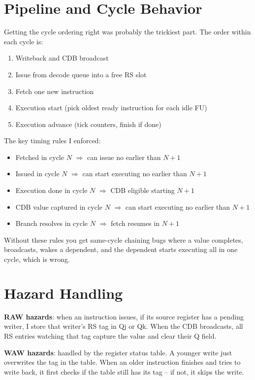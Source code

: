 \documentclass[11pt]{article}
\begin{document}
\section{Pipeline and Cycle Behavior}
Getting the cycle ordering right was probably the trickiest part. The order within each cycle is:

\begin{enumerate}[leftmargin=1.5em]
\item Writeback and CDB broadcast
\item Issue from decode queue into a free RS slot
\item Fetch one new instruction
\item Execution start (pick oldest ready instruction for each idle FU)
\item Execution advance (tick counters, finish if done)
\end{enumerate}

The key timing rules I enforced:

\begin{itemize}
\item Fetched in cycle $N$ $\Rightarrow$ can issue no earlier than $N+1$
\item Issued in cycle $N$ $\Rightarrow$ can start executing no earlier than $N+1$
\item Execution done in cycle $N$ $\Rightarrow$ CDB eligible starting $N+1$
\item CDB value captured in cycle $N$ $\Rightarrow$ can start executing no earlier than $N+1$
\item Branch resolves in cycle $N$ $\Rightarrow$ fetch resumes in $N+1$
\end{itemize}

Without these rules you get same-cycle chaining bugs where a value completes, broadcasts, wakes a dependent, and the dependent starts executing all in one cycle, which is wrong.

\section{Hazard Handling}
\textbf{RAW hazards}: when an instruction issues, if its source register has a pending writer, I store that writer's RS tag in Qj or Qk. When the CDB broadcasts, all RS entries watching that tag capture the value and clear their Q field.

\textbf{WAW hazards}: handled by the register status table. A younger write just overwrites the tag in the table. When an older instruction finishes and tries to write back, it first checks if the table still has its tag -- if not, it skips the write.
\end{document}
